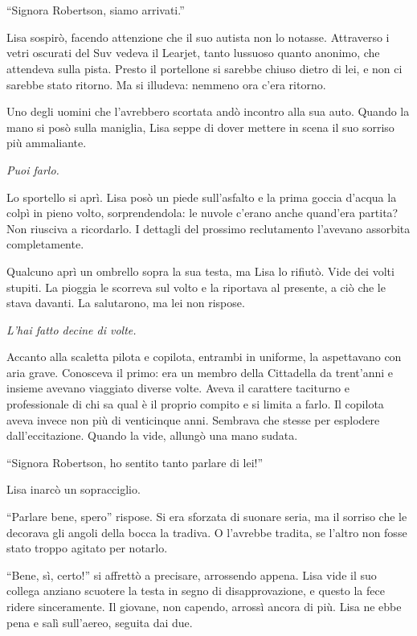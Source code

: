 \chapter{}
\label{ch:1}

``Signora Robertson, siamo arrivati.''

Lisa sospirò, facendo attenzione che il suo autista non lo notasse. Attraverso i vetri oscurati del
Suv vedeva il Learjet, tanto lussuoso quanto anonimo, che attendeva sulla pista. Presto il
portellone si sarebbe chiuso dietro di lei, e non ci sarebbe stato ritorno. Ma si illudeva: nemmeno
ora c'era ritorno.

Uno degli uomini che l'avrebbero scortata andò incontro alla sua auto. Quando la mano si posò sulla
maniglia, Lisa seppe di dover mettere in scena il suo sorriso più ammaliante.

\emph{Puoi farlo.}

Lo sportello si aprì. Lisa posò un piede sull'asfalto e la prima goccia d'acqua la colpì in pieno
volto, sorprendendola: le nuvole c'erano anche quand'era partita? Non riusciva a ricordarlo. I
dettagli del prossimo reclutamento l'avevano assorbita completamente.

Qualcuno aprì un ombrello sopra la sua testa, ma Lisa lo rifiutò. Vide dei volti stupiti. La pioggia
le scorreva sul volto e la riportava al presente, a ciò che le stava davanti. La salutarono, ma lei
non rispose.

\emph{L'hai fatto decine di volte.}

Accanto alla scaletta pilota e copilota, entrambi in uniforme, la aspettavano con aria grave.
Conosceva il primo: era un membro della Cittadella da trent'anni e insieme avevano viaggiato diverse
volte. Aveva il carattere taciturno e professionale di chi sa qual è il proprio compito e si limita
a farlo. Il copilota aveva invece non più di venticinque anni. Sembrava che stesse per esplodere
dall'eccitazione. Quando la vide, allungò una mano sudata.

``Signora Robertson, ho sentito tanto parlare di lei!''

Lisa inarcò un sopracciglio.

``Parlare bene, spero'' rispose. Si era sforzata di suonare seria, ma il sorriso che le decorava gli
angoli della bocca la tradiva. O l'avrebbe tradita, se l'altro non fosse stato troppo agitato per
notarlo.

``Bene, sì, certo!'' si affrettò a precisare, arrossendo appena. Lisa vide il suo collega anziano
scuotere la testa in segno di disapprovazione, e questo la fece ridere sinceramente. Il giovane, non
capendo, arrossì ancora di più. Lisa ne ebbe pena e salì sull'aereo, seguita dai due.

